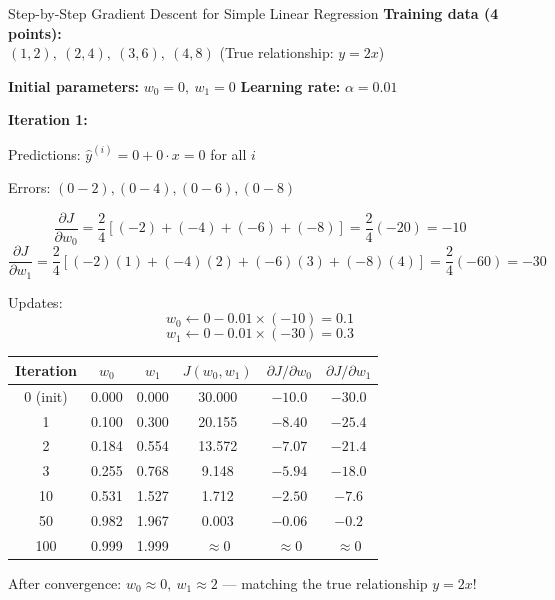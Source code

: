 \documentclass[12pt,a4paper]{report}
\begin{document}
\begin{examplebox}{Step-by-Step Gradient Descent for Simple Linear Regression}
\textbf{Training data (4 points):}\\
$(1, 2),\ (2, 4),\ (3, 6),\ (4, 8)$ \quad (True relationship: $y = 2x$)

\textbf{Initial parameters:} $w_0 = 0,\ w_1 = 0$ \quad \textbf{Learning rate:} $\alpha = 0.01$

\vspace{0.3cm}
\textbf{Iteration 1:}

Predictions: $\hat{y}^{(i)} = 0 + 0 \cdot x = 0$ for all $i$

Errors: $(0-2), (0-4), (0-6), (0-8)$

\[
\frac{\partial J}{\partial w_0} = \frac{2}{4}\left[(-2)+(-4)+(-6)+(-8)\right] = \frac{2}{4}(-20) = -10
\]
\[
\frac{\partial J}{\partial w_1} = \frac{2}{4}\left[(-2)(1)+(-4)(2)+(-6)(3)+(-8)(4)\right] = \frac{2}{4}(-60) = -30
\]

Updates:
\[
w_0 \leftarrow 0 - 0.01 \times (-10) = 0.1
\]
\[
w_1 \leftarrow 0 - 0.01 \times (-30) = 0.3
\]

\vspace{0.3cm}

\begin{center}
\begin{tabular}{cccccc}
\toprule
\textbf{Iteration} & $w_0$ & $w_1$ & $J(w_0, w_1)$ & $\partial J/\partial w_0$ & $\partial J/\partial w_1$ \\
\midrule
0 (init) & 0.000 & 0.000 & 30.000 & $-10.0$ & $-30.0$ \\
1 & 0.100 & 0.300 & 20.155 & $-8.40$ & $-25.4$ \\
2 & 0.184 & 0.554 & 13.572 & $-7.07$ & $-21.4$ \\
3 & 0.255 & 0.768 & 9.148 & $-5.94$ & $-18.0$ \\
10 & 0.531 & 1.527 & 1.712 & $-2.50$ & $-7.6$ \\
50 & 0.982 & 1.967 & 0.003 & $-0.06$ & $-0.2$ \\
100 & 0.999 & 1.999 & $\approx 0$ & $\approx 0$ & $\approx 0$ \\
\bottomrule
\end{tabular}
\end{center}

\vspace{0.3cm}
After convergence: $w_0 \approx 0,\ w_1 \approx 2$ --- matching the true relationship $y = 2x$!
\end{examplebox}
\end{document}
